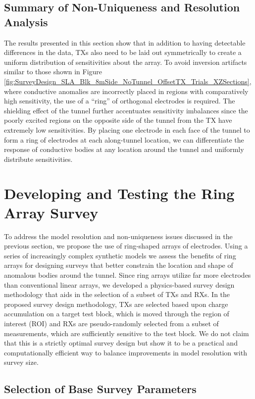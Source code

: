 \documentclass[preprint,authoryear,12pt]{elsarticle}
\begin{document}
\subsection{Summary of Non-Uniqueness and Resolution Analysis}
The results presented in this section show that in addition to having detectable differences in the data, TXs also need to be laid out symmetrically to create a uniform distribution of sensitivities about the array. To avoid inversion artifacts similar to those shown in Figure \ref{fig:SurveyDesign_SLA_Blk_8mSide_NoTunnel_OffsetTX_Trials_XZSections}, where conductive anomalies are incorrectly placed in regions with comparatively high sensitivity, the use of a ``ring'' of orthogonal electrodes is required. The shielding effect of the tunnel further accentuates sensitivity imbalances since the poorly excited regions on the opposite side of the tunnel from the TX have extremely low sensitivities. By placing one electrode in each face of the tunnel to form a ring of electrodes at each along-tunnel location, we can differentiate the response of conductive bodies at any location around the tunnel and uniformly distribute sensitivities.


\section{Developing and Testing the Ring Array Survey}
\label{sec:RingArray_Development}

To address the model resolution and non-uniqueness issues discussed in the previous section, we propose the use of ring-shaped arrays of electrodes. Using a series of increasingly complex synthetic models we assess the benefits of ring arrays for designing surveys that better constrain the location and shape of anomalous bodies around the tunnel. Since ring arrays utilize far more electrodes than conventional linear arrays, we developed a physics-based survey design methodology that aids in the selection of a subset of TXs and RXs. In the proposed survey design methodology, TXs are selected based upon charge accumulation on a target test block, which is moved through the region of interest (ROI) and RXs are pseudo-randomly selected from a subset of measurements, which are sufficiently sensitive to the test block. We do not claim that this is a strictly optimal survey design but show it to be a practical and computationally efficient way to balance improvements in model resolution with survey size.

\subsection{Selection of Base Survey Parameters}
\label{sec:RingArray_Development_BaseSurveyParams}
\end{document}
